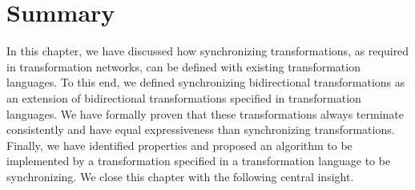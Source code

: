 \section{Summary}


In this chapter, we have discussed how synchronizing transformations, as required in transformation networks, can be defined with existing transformation languages.
To this end, we defined synchronizing bidirectional transformations as an extension of bidirectional transformations specified in transformation languages.
We have formally proven that these transformations always terminate consistently and have equal expressiveness than synchronizing transformations.
Finally, we have identified properties and proposed an algorithm to be implemented by a transformation specified in a transformation language to be synchronizing.
We close this chapter with the following central insight.


